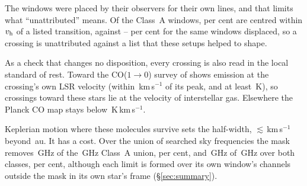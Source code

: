 The windows were placed by their observers for their own lines, and that
limits what ``unattributed'' means. Of the Class~A windows, \TnCenPct{} per
cent are centred within $v_{\rm h}$ of a listed transition, against
\TnCtrlCenLo--\TnCtrlCenHi{} per cent for the same windows displaced, so a
crossing is unattributed against a list that these setups helped to shape.

As a check that changes no disposition, every crossing is also read in the
local standard of rest. Toward
\LsCloudStars{} the CO($1\to0$) survey of \citet{DameThaddeus2022,Dame2001}
shows emission at the crossing's own LSR velocity (within
\LsCloudDvMax\,km\,s$^{-1}$ of its peak, and at least \LsCloudTMin\,K), so
\LsNCloud{} crossings toward these stars lie at the velocity of
interstellar gas. Elsewhere the Planck CO
map \citep{PlanckCO2016} stays below
\LsPlanckMax\,K\,km\,s$^{-1}$.

Keplerian motion where these molecules survive sets the half-width,
$\lesssim$\EcKepVKms\,km\,s$^{-1}$ beyond \EcKepRAu\,au. It has a cost.
Over the union of searched sky frequencies the mask removes \MkMaskAGHz\,GHz
of the \CvUnionA\,GHz Class~A union, \MkMaskAPct{} per cent, and
\FrMaskLostGHz\,GHz of \FrMaskUnionGHz\,GHz over both classes, \FrMaskPct{}
per cent, although each limit is formed over its own window's channels
outside the mask in its own star's frame (\S\ref{sec:summary}).

\begin{table}
\centering
\footnotesize
\caption{The line mask by species: catalogue entries $N$ (each hyperfine
component one entry), transitions $n_{\rm t}$, and the frequencies and
upper-state energies they span.}
\label{tab:masklines}

\end{table}
